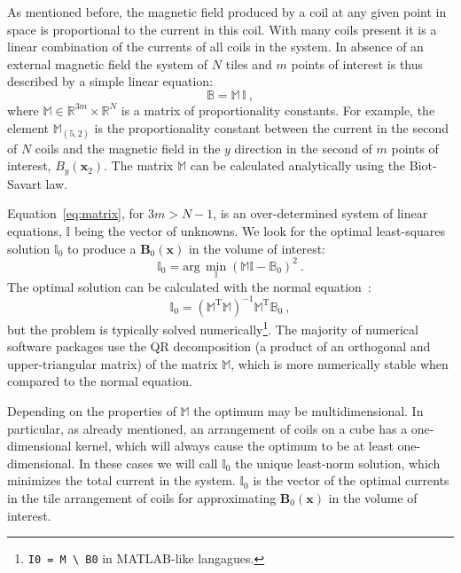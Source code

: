 As mentioned before, the magnetic field produced by a coil at any given point in space is proportional to the current in this coil. With many coils present it is a linear combination of the currents of all coils in the system. In absence of an external magnetic field the system of $N$ tiles and $m$ points of interest is thus described by a simple linear equation:
\begin{equation}
  \label{eq:matrix}
  \mathbb{B} = \mathbb{M} \, \mathbb{I}\ ,
\end{equation}
where $\mathbb{M} \in \mathbb{R}^{3 m} \times \mathbb{R}^{N}$ is a matrix of proportionality constants. For example, the element $\mathbb{M}_{(5, 2)}$ is the proportionality constant between the current in the second of $N$ coils and the magnetic field in the $y$ direction in the second of $m$ points of interest, $B_y(\mathbf{x}_2)$. The matrix $\mathbb{M}$ can be calculated analytically using the Biot-Savart law.

Equation~\ref{eq:matrix}, for $3m > N - 1$, is an over-determined system of linear equations, $\mathbb{I}$ being the vector of unknowns. We look for the optimal least-squares solution $\mathbb{I}_0$ to produce a $\mathbf{B}_0(\mathbf{x})$ in the volume of interest:
\begin{equation}
  \label{eq:requirement}
  \mathbb{I}_0 = \mathrm{arg}\,\min_{\mathbb{I}} \left( \mathbb{M} \mathbb{I} - \mathbb{B}_0 \right)^2 \ .
\end{equation}
The optimal solution can be calculated with the normal equation~\cite{Anton}:
\begin{equation}
  \mathbb{I}_0 = \left( \mathbb{M}^\mathrm{T} \mathbb{M} \right)^{-1} \mathbb{M}^\mathrm{T} \mathbb{B}_0 \ ,
\end{equation}
but the problem is typically solved numerically\footnote{\texttt{I0 = M \textbackslash{} B0} in MATLAB-like langagues.}. The majority of numerical software packages use the QR decomposition (a product of an orthogonal and upper-triangular matrix) of the matrix $\mathbb{M}$, which is more numerically stable when compared to the normal equation.

Depending on the properties of $\mathbb{M}$ the optimum may be multidimensional. In particular, as already mentioned, an arrangement of coils on a cube has a one-dimensional kernel, which will always cause the optimum to be at least one-dimensional. In these cases we will call $\mathbb{I}_0$ the unique least-norm solution, which minimizes the total current in the system. $\mathbb{I}_0$ is the vector of the optimal currents in the tile arrangement of coils for approximating $\mathbf{B}_0(\mathbf{x})$ in the volume of interest.

